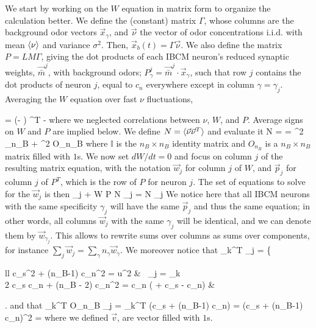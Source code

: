 We start by working on the $W$ equation in matrix form to organize the calculation better. We define the (constant) matrix $\Gamma$, whose columns are the background odor vectors $\vec{x}_{\gamma}$, and $\vec{\nu}$ the vector of odor concentrations i.i.d. with mean $\braket{\nu}$ and variance $\sigma^2$. Then, $\vec{x}_b(t) = \Gamma \vec{\nu}$. We also define the matrix $P = LM \Gamma$, giving the dot products of each IBCM neuron's reduced synaptic weights, $\vec{\bar{m}}^j$, with background odors; $P_{\gamma}^j = \vec{\bar{m}}^j \cdot \vec{x}_{\gamma}$, such that row $j$ contains the dot products of neuron $j$, equal to $c_n$ everywhere except in column $\gamma = \gamma_j$. Averaging the $W$ equation over fast $\nu$ fluctuations, 

\beq
	 = \alpha (\Gamma - )  ^T - \beta {}
	\label{eq:average_W_matrix}
\eeq
where we neglected correlations between $\nu$, $W$, and $P$. Average signs on $W$ and $P$ are implied below. We define $N = \braket{\vec{\nu} \vec{\nu}^T}$ and evaluate it
\beq
	N =  = \sigma^2 _{n_B} + \avgnu^2 O_{n_B}
	\label{eq:nu_correl_matrix}
\eeq
where $\mathbb{I}$ is the $n_B \times n_B$ identity matrix and $O_{n_B}$ is a $n_B \times n_B$ matrix filled with $1$s. We now set $dW/dt=0$ and focus on column $j$ of the resulting matrix equation, with the notation $\vec{w}_j$ for column $j$ of $W$, and $\vec{p}_j$ for column $j$ of $P^T$, which is the row of $P$ for neuron $j$. The set of equations to solve for the $\vec{w}_j$ is then
\beq
\frac{\beta}{\alpha} _j  + W P N _j = \Gamma N _j
\label{eq:wj_equation}
\eeq
We notice here that all IBCM neurons with the same specificity $\gamma_j$ will have the same $\vec{p}_j$ and thus the same equation; in other words, all columns $\vec{w}_j$ with the same $\gamma_j$ will be identical, and we can denote them by $\vec{w}_{\gamma_j}$. This allows to rewrite sums over columns as sums over components, for instance $\sum_j \vec{w}_j = \sum_{\gamma} n_{\gamma} \vec{w}_{\gamma}$. We moreover notice that
\beq
	_k^T _j = \left\{ \begin{array}{ll} 
		c_s^2 + (n_B-1) c_n^2 = u^2  &  \, \gamma_j = \gamma_k	\\
		2 c_s c_n + (n_B - 2) c_n^2 = c_n ( + c_s - c_n) &  
	\end{array} \right.
\label{eq:rule_pj_pk}
\eeq
and that 
\beq
	_k^T O_{n_B} _j = _k^T  (c_s + (n_B-1) c_n) = (c_s + (n_B-1) c_n)^2 = 
	\label{eq:rule_pj_O}
\eeq
where we defined $\vec{v}$, are vector filled with $1$s. 

